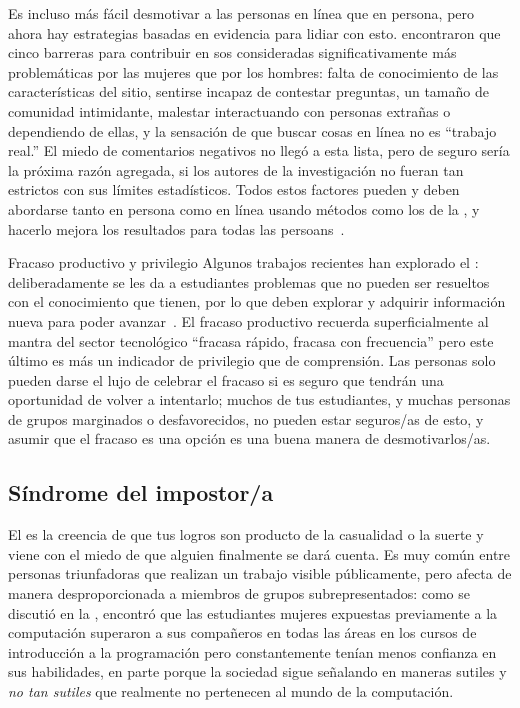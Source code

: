 Es incluso más fácil desmotivar a las personas en línea que en persona,
pero ahora hay estrategias basadas en evidencia para lidiar con esto.
\cite{Ford2016} encontraron que cinco barreras para contribuir en 
sos consideradas significativamente más problemáticas por las mujeres que por los hombres:
falta de conocimiento de las características del sitio,
sentirse incapaz de contestar preguntas,
un tamaño de comunidad intimidante,
malestar interactuando con personas extrañas o dependiendo de ellas,
y la sensación de que buscar cosas en línea no es ``trabajo real.''
El miedo de comentarios negativos no llegó a esta lista,
pero de seguro sería la próxima razón agregada, si los autores de la investigación no fueran tan estrictos con sus límites estadísticos.
Todos estos factores pueden y deben abordarse tanto en persona como en línea
usando métodos como los de la ,
y hacerlo mejora los resultados para todas las persoans~\cite{Sved2016}.

\begin{aside}{Fracaso productivo y privilegio}
  Algunos trabajos recientes han explorado el : 
  deliberadamente se les da a estudiantes problemas que no pueden ser resueltos con el conocimiento que tienen, por lo que
  deben explorar y adquirir información nueva para poder avanzar~\cite{Kapu2016}.
    El fracaso productivo recuerda superficialmente al mantra del sector tecnológico ``fracasa rápido, fracasa con frecuencia''
    pero este último es más un indicador de privilegio que de comprensión.
    Las personas solo pueden darse el lujo de celebrar el fracaso si es seguro que tendrán una oportunidad de volver a intentarlo;
    muchos de tus estudiantes,
    y muchas personas de grupos marginados o desfavorecidos,
    no pueden estar seguros/as de esto,
    y asumir que el fracaso es una opción es una buena manera de desmotivarlos/as.
\end{aside}

\subsection*{Síndrome del impostor/a}

El 
es la creencia de que tus logros son producto de la casualidad o la suerte
y viene con el miedo de que alguien finalmente se dará cuenta.
Es muy común entre personas triunfadoras que realizan un trabajo visible públicamente,
pero afecta de manera desproporcionada a miembros de grupos subrepresentados:
como se discutió en la ,
\cite{Wilc2018} encontró que
las estudiantes mujeres expuestas previamente a la computación superaron a sus compañeros en todas las áreas en los cursos de introducción a la programación
pero constantemente tenían menos confianza en sus habilidades,
en parte porque la sociedad sigue señalando en maneras sutiles y \emph{no tan sutiles}
que realmente no pertenecen al mundo de la computación.


